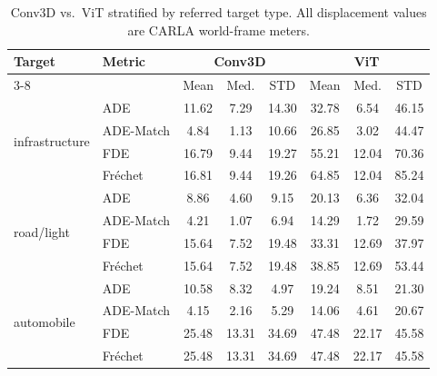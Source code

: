 \begin{table}[ht]
\begin{center}
\small
\begin{tabular}{|l|l|ccc|ccc|}
\hline
\multirow{2}{*}{Target} & \multirow{2}{*}{Metric} & \multicolumn{3}{c|}{Conv3D} & \multicolumn{3}{c|}{ViT} \\ \cline{3-8}
 & & Mean & Med. & STD & Mean & Med. & STD \\ \hline
\multirow{4}{*}{infrastructure} & ADE & 11.62 & 7.29 & 14.30 & 32.78 & 6.54 & 46.15 \\
 & ADE-Match & 4.84 & 1.13 & 10.66 & 26.85 & 3.02 & 44.47 \\
 & FDE & 16.79 & 9.44 & 19.27 & 55.21 & 12.04 & 70.36 \\
 & Fr\'{e}chet & 16.81 & 9.44 & 19.26 & 64.85 & 12.04 & 85.24 \\ \hline
\multirow{4}{*}{road/light} & ADE & 8.86 & 4.60 & 9.15 & 20.13 & 6.36 & 32.04 \\
 & ADE-Match & 4.21 & 1.07 & 6.94 & 14.29 & 1.72 & 29.59 \\
 & FDE & 15.64 & 7.52 & 19.48 & 33.31 & 12.69 & 37.97 \\
 & Fr\'{e}chet & 15.64 & 7.52 & 19.48 & 38.85 & 12.69 & 53.44 \\ \hline
\multirow{4}{*}{automobile} & ADE & 10.58 & 8.32 & 4.97 & 19.24 & 8.51 & 21.30 \\
 & ADE-Match & 4.15 & 2.16 & 5.29 & 14.06 & 4.61 & 20.67 \\
 & FDE & 25.48 & 13.31 & 34.69 & 47.48 & 22.17 & 45.58 \\
 & Fr\'{e}chet & 25.48 & 13.31 & 34.69 & 47.48 & 22.17 & 45.58 \\ \hline
\end{tabular}
\end{center}
\caption{Conv3D vs.\ ViT stratified by referred target type. All displacement values are CARLA world-frame meters.}
\label{table:target_type}
\end{table}


